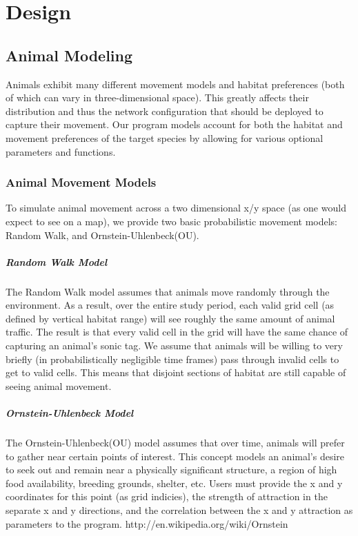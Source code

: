 \chapter{Design}

\section{Animal Modeling}
Animals exhibit many different movement models and habitat preferences (both of which can vary in three-dimensional space).  This greatly affects their distribution and thus the network configuration that should be deployed to capture their movement.  Our program models account for both the habitat and movement preferences of the target species by allowing for various optional parameters and functions.

\subsection{Animal Movement Models}
 To simulate animal movement across a two dimensional x/y space (as one would expect to see on a map), we provide two basic probabilistic movement models: Random Walk, and Ornstein-Uhlenbeck(OU).  

\paragraph{Random Walk Model}
The Random Walk model assumes that animals move randomly through the environment.  As a result, over the entire study period, each valid grid cell (as defined by vertical habitat range) will see roughly the same amount of animal traffic.  The result is that every valid cell  in the grid will have the same chance of capturing an animal's sonic tag.  We assume that animals will be willing to very briefly (in probabilistically negligible time frames) pass through invalid cells to get to valid cells.  This means that disjoint sections of habitat are still capable of seeing animal movement.

\paragraph{Ornstein-Uhlenbeck Model}
The Ornstein-Uhlenbeck(OU) model assumes that over time, animals will prefer to gather near certain points of interest.  This concept models an animal's desire to seek out and remain near a physically significant structure, a region of high food availability, breeding grounds, shelter, etc.  Users must provide the x and y coordinates for this point (as grid indicies), the strength of attraction in the separate x and y directions, and the correlation between the x and y attraction as parameters to the program.  
 http://en.wikipedia.org/wiki/Ornstein%



